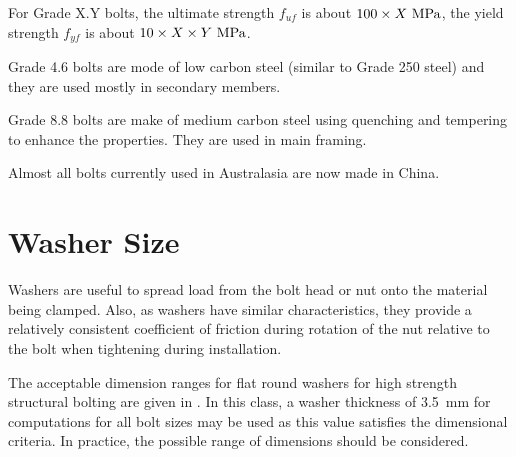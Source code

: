 For Grade X.Y bolts, the ultimate strength $f_{uf}$ is about $100\times{}X~\si{\mega\pascal}$, the yield strength $f_{yf}$ is about $10\times{}X\times{}Y~\si{\mega\pascal}$.

Grade 4.6 bolts are mode of low carbon steel (similar to Grade 250 steel) and they are used mostly in secondary members.

Grade 8.8 bolts are make of medium carbon steel using quenching and tempering to enhance the properties. They are used in main framing.

Almost all bolts currently used in Australasia are now made in China.
\section{Washer Size}
Washers are useful to spread load from the bolt head or nut onto the material being clamped. Also, as washers have similar characteristics, they provide a relatively consistent coefficient of friction during rotation of the nut relative to the bolt when tightening during installation.

The acceptable dimension ranges for flat round washers for high strength structural bolting are given in . In this class, a washer thickness of \SI{3.5}{\mm} for computations for all bolt sizes may be used as this value satisfies the dimensional criteria. In practice, the possible range of dimensions should be considered.
